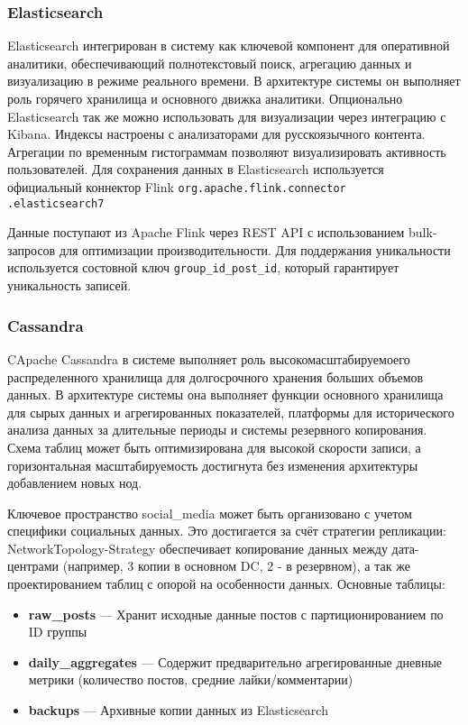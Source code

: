         \subsubsection{Elasticsearch}
            Elasticsearch интегрирован в систему как ключевой компонент для оперативной аналитики, обеспечивающий полнотекстовый поиск, агрегацию данных и визуализацию в режиме реального времени. В архитектуре системы он выполняет роль горячего хранилища и основного движка аналитики. Опционально Elasticsearch так же можно использовать для визуализации через интеграцию с Kibana. Индексы настроены с анализаторами для русскоязычного контента. Агрегации по временным гистограммам позволяют визуализировать активность пользователей. Для сохранения данных в Elasticsearch используется официальный коннектор Flink \texttt{org.apache.flink.connector\\.elasticsearch7}

            Данные поступают из Apache Flink через REST API с использованием bulk-запросов для оптимизации производительности. Для поддержания уникальности используется состовной ключ \texttt{group\_id\_post\_id}, который гарантирует уникальность записей.

        \subsubsection{Cassandra}
            CApache Cassandra в системе выполняет роль высокомасштабируемоего распределенного хранилища для долгосрочного хранения больших объемов данных. В архитектуре системы она выполняет функции основного хранилища для сырых данных и агрегированных показателей, платформы для исторического анализа данных за длительные периоды и системы резервного копирования. Схема таблиц может быть оптимизирована для высокой скорости записи, а горизонтальная масштабируемость достигнута без изменения архитектуры добавлением новых нод.  

            Ключевое пространство social\_media может быть организовано с учетом специфики социальных данных. Это достигается за счёт стратегии репликации: NetworkTopology-Strategy обеспечивает копирование данных между дата-центрами (например, 3 копии в основном DC, 2 - в резервном), а так же проектированием таблиц с опорой на особенности данных. Основные таблицы:
            \begin{itemize}
                \item \textbf{raw\_posts} — Хранит исходные данные постов с партиционированием по ID группы
                \item \textbf{daily\_aggregates} — Содержит предварительно агрегированные дневные метрики (количество постов, средние лайки/комментарии)
                \item \textbf{backups} — Архивные копии данных из Elasticsearch
            \end{itemize}

